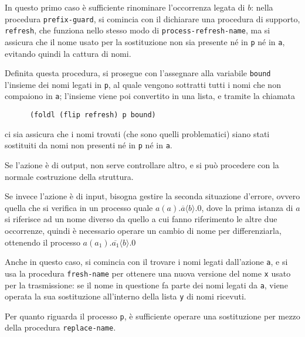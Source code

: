 In questo primo caso \`e sufficiente rinominare l'occorrenza legata di $b$:
nella procedura \lstinline{prefix-guard}, si comincia con il dichiarare una
procedura di supporto, \lstinline{refresh}, che funziona nello stesso modo
di \lstinline{process-refresh-name}, ma si assicura che il nome usato per
la sostituzione non sia presente n\'e in \lstinline{p} n\'e in
\lstinline{a}, evitando quindi la cattura di nomi.

Definita questa procedura, si prosegue con l'assegnare alla variabile
\lstinline{bound} l'insieme dei nomi legati in \lstinline{p}, al quale
vengono sottratti tutti i nomi che non compaiono in \lstinline{a};
l'insieme viene poi convertito in una lista, e tramite la chiamata

\begin{lstlisting}
      (foldl (flip refresh) p bound)
\end{lstlisting}

ci sia assicura che i nomi trovati (che sono quelli problematici) siano
stati sostituiti da nomi non presenti n\'e in \lstinline{p} n\'e in
\lstinline{a}.

Se l'azione \`e di output, non serve controllare altro, e si pu\`o procedere
con la normale costruzione della struttura.

Se invece l'azione \`e di input, bisogna gestire la seconda situazione
d'errore, ovvero quella che si verifica in un processo quale
$a(a).\overline{a}\langle b\rangle.0$, dove la prima istanza di $a$ si
riferisce ad un nome diverso da quello a cui fanno riferimento le altre due
occorrenze, quindi \`e necessario operare un cambio di nome per
differenziarla, ottenendo il processo
$a(a_1).\overline{a_1}\langle b\rangle.0$

Anche in questo caso, si comincia con il trovare i nomi legati dall'azione
\lstinline{a}, e si usa la procedura \lstinline{fresh-name} per ottenere
una nuova versione del nome \lstinline{x} usato per la trasmissione: se il
nome in questione fa parte dei nomi legati da \lstinline{a}, viene
operata la sua sostituzione all'interno della lista \lstinline{y} di nomi
ricevuti.

Per quanto riguarda il processo \lstinline{p}, \`e sufficiente operare una
sostituzione per mezzo della procedura \lstinline{replace-name}.
